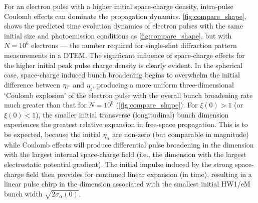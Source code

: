 For an electron pulse with a higher initial space-charge density, intra-pulse Coulomb effects can dominate the propagation dynamics.
\ref{fig:compare_shape}, shows the predicted time evolution dynamics of electron pulses with the same initial size and photoemission conditions as \ref{fig:compare_shape}, but with $ N = 10^{6} $ electrons --- the number required for single-shot diffraction pattern measurements in a DTEM.\cite{berger_dc_2009,armstrong_practical_2007}
The significant influence of space-charge effects for the higher initial peak pulse charge density is clearly evident.
In the spherical case, space-charge induced bunch broadening begins to overwhelm the initial difference between $\eta_{{\scriptscriptstyle T}}$ and $\eta_{z}$, producing a more uniform three-dimensional `Coulomb explosion' of the electron pulse with the overall bunch broadening rate much greater than that for $ N = 10^{0} $ (\ref{fig:compare_shape}).
For $ \xi (0) > 1 $ (or $ \xi (0) < 1 $), the smaller initial transverse (longitudinal) bunch dimension experiences the greatest relative expansion in free-space propagation. This is to be expected, because the initial $\eta_{\alpha}$ are non-zero (but comparable in magnitude) while Coulomb effects will produce differential pulse broadening in the dimension with the largest internal space-charge field (i.e., the dimension with the largest electrostatic potential gradient).
The initial impulse induced by the strong space-charge field then provides for continued linear expansion (in time), resulting in a linear pulse chirp in the dimension associated with the smallest initial HW1/eM bunch width\cite{michalik_analytic_2006,berger_dc_2009} $ \sqrt{ 2 \sigma_{\alpha} (0) } $.


